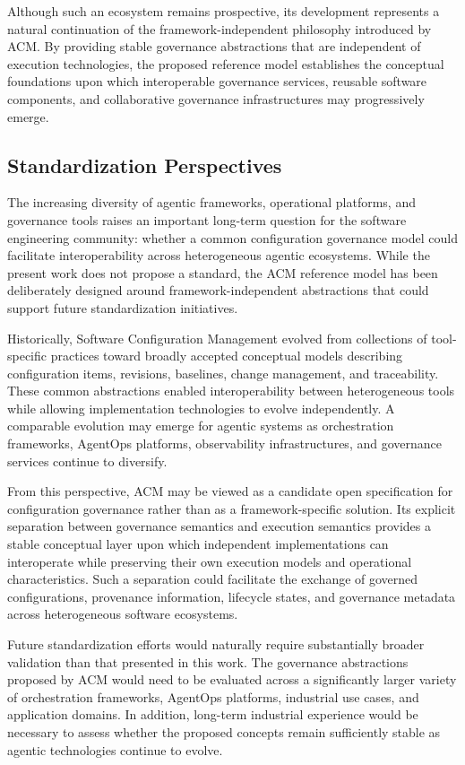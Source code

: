 \documentclass[10pt]{article}
\begin{document}
Although such an ecosystem remains prospective, its development represents a natural continuation of the framework-independent philosophy introduced by ACM. By providing stable governance abstractions that are independent of execution technologies, the proposed reference model establishes the conceptual foundations upon which interoperable governance services, reusable software components, and collaborative governance infrastructures may progressively emerge.

\subsection{Standardization Perspectives}

The increasing diversity of agentic frameworks, operational platforms, and governance tools raises an important long-term question for the software engineering community: whether a common configuration governance model could facilitate interoperability across heterogeneous agentic ecosystems. While the present work does not propose a standard, the ACM reference model has been deliberately designed around framework-independent abstractions that could support future standardization initiatives.

Historically, Software Configuration Management evolved from collections of tool-specific practices toward broadly accepted conceptual models describing configuration items, revisions, baselines, change management, and traceability. These common abstractions enabled interoperability between heterogeneous tools while allowing implementation technologies to evolve independently. A comparable evolution may emerge for agentic systems as orchestration frameworks, AgentOps platforms, observability infrastructures, and governance services continue to diversify.

From this perspective, ACM may be viewed as a candidate open specification for configuration governance rather than as a framework-specific solution. Its explicit separation between governance semantics and execution semantics provides a stable conceptual layer upon which independent implementations can interoperate while preserving their own execution models and operational characteristics. Such a separation could facilitate the exchange of governed configurations, provenance information, lifecycle states, and governance metadata across heterogeneous software ecosystems.

Future standardization efforts would naturally require substantially broader validation than that presented in this work. The governance abstractions proposed by ACM would need to be evaluated across a significantly larger variety of orchestration frameworks, AgentOps platforms, industrial use cases, and application domains. In addition, long-term industrial experience would be necessary to assess whether the proposed concepts remain sufficiently stable as agentic technologies continue to evolve.
\end{document}
